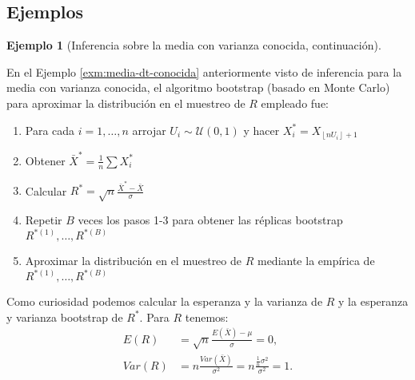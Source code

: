 \documentclass[
]{book}
\theoremstyle{break}
\theoremstyle{definition}
\theoremstyle{definition}
\newtheorem{example}{Ejemplo}[chapter]
\theoremstyle{definition}
\theoremstyle{remark}
\begin{document}
\hypertarget{ejemplos}{%
\subsection{Ejemplos}\label{ejemplos}}

\begin{example}[Inferencia sobre la media con varianza conocida, continuación]
\protect\hypertarget{exm:media-dt-conocida-perturbando}{}{\label{exm:media-dt-conocida-perturbando} \iffalse (Inferencia sobre la media con varianza conocida, continuación) \fi{} }
\end{example}

En el Ejemplo \ref{exm:media-dt-conocida} anteriormente visto de inferencia para la media con
varianza conocida, el algoritmo bootstrap (basado en Monte Carlo) para
aproximar la distribución en el muestreo de \(R\) empleado fue:

\begin{enumerate}
\def\labelenumi{\arabic{enumi}.}
\item
  Para cada \(i=1,\ldots ,n\) arrojar \(U_i\sim \mathcal{U}\left( 0,1 \right)\) y
  hacer \(X_i^{\ast}=X_{\left\lfloor nU_i\right\rfloor +1}\)
\item
  Obtener \(\bar{X}^{\ast}=\frac{1}{n}\sum X_i^{\ast}\)
\item
  Calcular
  \(R^{\ast}=\sqrt{n}\frac{\bar{X}^{\ast}-\bar{X}}{ \sigma }\)
\item
  Repetir \(B\) veces los pasos 1-3 para obtener las réplicas bootstrap
  \(R^{\ast (1)}, \ldots, R^{\ast (B)}\)
\item
  Aproximar la distribución en el muestreo de \(R\) mediante la empírica
  de \(R^{\ast (1)}, \ldots, R^{\ast (B)}\)
\end{enumerate}

Como curiosidad podemos calcular la esperanza y la varianza de \(R\) y la
esperanza y varianza bootstrap de \(R^{\ast}\). Para \(R\) tenemos:
\[\begin{aligned}
E\left( R \right) &=\sqrt{n}\frac{E\left( \bar{X} \right) -\mu }{\sigma }
=0, \\
Var\left( R \right) &=n\frac{Var\left( \bar{X} \right)}{\sigma^2}=n
\frac{\frac{1}{n}\sigma^2}{\sigma^2}=1.
\end{aligned}\]
\end{document}
